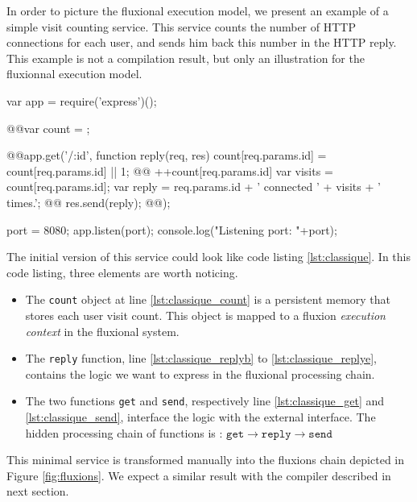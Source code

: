 In order to picture the fluxional execution model, we present an example of a simple visit counting service.
This service counts the number of HTTP connections for each user, and sends him back this number in the HTTP reply.
This example is not a compilation result, but only an illustration for the fluxionnal execution model.

\begin{code}[Javascript, caption={Original code of a simple service example},label={lst:classique}]
var app = require('express')();

@\label{lst:classique_count}@var count = {};

@\label{lst:classique_get}\label{lst:classique_replyb}@app.get('/:id', function reply(req, res){
  count[req.params.id] = count[req.params.id]  || 1; @\label{lst:classique_dynres}@
  ++count[req.params.id] 
  var visits = count[req.params.id];
  var reply = req.params.id + ' connected ' + visits + ' times.';
@\label{lst:classique_send}@  res.send(reply);
@\label{lst:classique_replye}@});

port = 8080;
app.listen(port);
console.log("Listening port: "+port);
\end{code}

The initial version of this service could look like code listing \ref{lst:classique}.
In this code listing, three elements are worth noticing.

\begin{itemize}
  \item The \texttt{count} object at line \ref{lst:classique_count} is a persistent memory that stores each user visit count.
  This object is mapped to a fluxion \textit{execution context} in the fluxional system.
  \item The \texttt{reply} function, line \ref{lst:classique_replyb} to \ref{lst:classique_replye}, contains the logic we want to express in the fluxional processing chain.
  \item The two functions \texttt{get} and \texttt{send}, respectively line \ref{lst:classique_get} and \ref{lst:classique_send}, interface the logic with the external interface.
  The hidden processing chain of functions is : $\texttt{get} \to \texttt{reply} \to \texttt{send}$
\end{itemize}

This minimal service is transformed manually into the fluxions chain depicted in Figure \ref{fig:fluxions}.
We expect a similar result with the compiler described in next section.

